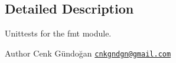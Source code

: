 \subsection{Detailed Description}
Unittests for the {\ttfamily fmt} module. 

\begin{DoxyAuthor}{Author}
Cenk Gündoğan \href{mailto:cnkgndgn@gmail.com}{\tt cnkgndgn@gmail.\+com} 
\end{DoxyAuthor}

